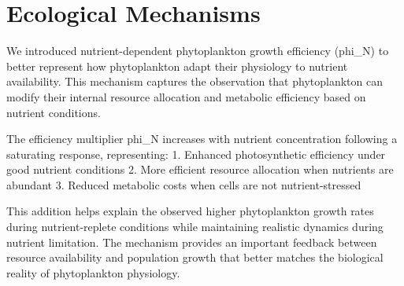 \section{Ecological Mechanisms}

We introduced nutrient-dependent phytoplankton growth efficiency (phi_N) to better represent how phytoplankton adapt their physiology to nutrient availability. This mechanism captures the observation that phytoplankton can modify their internal resource allocation and metabolic efficiency based on nutrient conditions.

The efficiency multiplier phi_N increases with nutrient concentration following a saturating response, representing:
1. Enhanced photosynthetic efficiency under good nutrient conditions
2. More efficient resource allocation when nutrients are abundant
3. Reduced metabolic costs when cells are not nutrient-stressed

This addition helps explain the observed higher phytoplankton growth rates during nutrient-replete conditions while maintaining realistic dynamics during nutrient limitation. The mechanism provides an important feedback between resource availability and population growth that better matches the biological reality of phytoplankton physiology.
